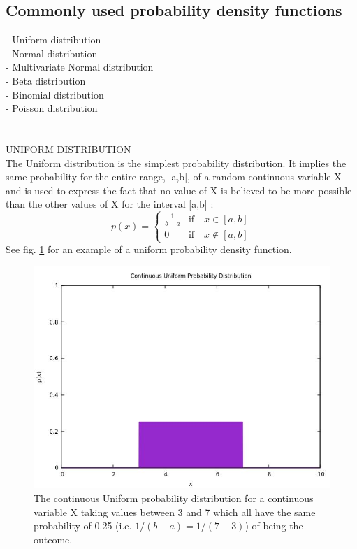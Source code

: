 \documentclass {article}
\begin{document}
\subsection {Commonly used probability density functions}

- Uniform distribution\\
- Normal distribution \\
- Multivariate Normal distribution \\
- Beta distribution \\
- Binomial distribution \\
- Poisson distribution \\
\\
\\
UNIFORM DISTRIBUTION \\
The Uniform distribution is the simplest probability distribution. 
It implies the same probability for the entire range, [a,b], of a random continuous variable X and is used to express the fact that no value of X is believed to be more possible than the other values of X for the interval [a,b] \cite{jackman_bayesian_2009} \cite{lial_calculus_2012} \cite{pfeffer_practical_2016}:
\tab
\begin{equation}
 p(x)= 
\begin{cases}
\frac{1}{b-a} & \text{if} \quad x\in[a,b] \\
0 & \text{if} \quad x\notin [a,b]
\end{cases} 
\end{equation}
See fig. \ref{fig: unif distr} for an example of a uniform probability density function. 
\begin{figure} [H]
\includegraphics[width=\linewidth] {fig3.jpg}
\caption{The continuous Uniform probability distribution for a continuous variable X taking values between 3 and 7 which all have the same probability of 0.25 (i.e. $1/(b-a)=1/(7-3)$) of being the outcome.}
\label{fig: unif distr}
\end{figure}
\end{document}
